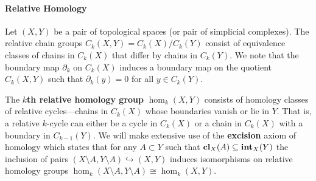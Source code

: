 \paragraph{Relative Homology}

Let $(X, Y)$ be a pair of topological spaces (or pair of simplicial complexes).
The relative chain groups $C_k(X, Y) = C_k(X) / C_k(Y)$ consist of equivalence classes of chains in $C_k(X)$ that differ by chains in $C_k(Y)$.
We note that the boundary map $\partial_k$ on $C_k(X)$ induces a boundary map on the quotient $C_k(X, Y)$ such that $\partial_k(y) = 0$ for all $y\in C_k(Y)$.

The \textbf{$k$th relative homology group} $\hom_k(X, Y)$ consists of homology classes of relative cycles---chains in $C_k(X)$ whose boundaries vanish or lie in $Y$.
That is, a relative $k$-cycle can either be a cycle in $C_k(X)$ or a chain in $C_k(X)$ with a boundary in $C_{k-1}(Y)$.
We will make extensive use of the \textbf{excision} axiom of homology which states that for any $A\subset Y$ such that $\mathbf{cl}_X(A)\subseteq \mathbf{int}_X(Y)$ the inclusion of pairs $(X\setminus A, Y\setminus A)\hookrightarrow (X, Y)$ induces isomorphisms on relative homology groups $\hom_k(X\setminus A, Y\setminus A)\cong\hom_k(X, Y)$.

%
%

